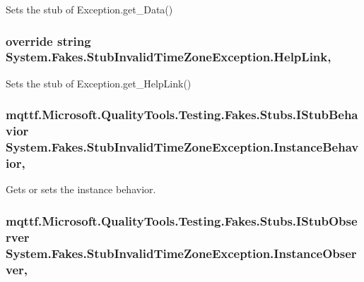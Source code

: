 Sets the stub of Exception.\-get\-\_\-\-Data()

\hypertarget{class_system_1_1_fakes_1_1_stub_invalid_time_zone_exception_a36448215bfd23451ae26c17ca0a390a2}{
\subsubsection[{Help\-Link}]{\setlength{\rightskip}{0pt plus 5cm}override string System.\-Fakes.\-Stub\-Invalid\-Time\-Zone\-Exception.\-Help\-Link\hspace{0.3cm}{\ttfamily [get]}, {\ttfamily [set]}}}\label{class_system_1_1_fakes_1_1_stub_invalid_time_zone_exception_a36448215bfd23451ae26c17ca0a390a2}


Sets the stub of Exception.\-get\-\_\-\-Help\-Link()

\hypertarget{class_system_1_1_fakes_1_1_stub_invalid_time_zone_exception_a7505d9efbe518862b0ae6f9dfc024340}{
\subsubsection[{Instance\-Behavior}]{\setlength{\rightskip}{0pt plus 5cm}mqttf.\-Microsoft.\-Quality\-Tools.\-Testing.\-Fakes.\-Stubs.\-I\-Stub\-Behavior System.\-Fakes.\-Stub\-Invalid\-Time\-Zone\-Exception.\-Instance\-Behavior\hspace{0.3cm}{\ttfamily [get]}, {\ttfamily [set]}}}\label{class_system_1_1_fakes_1_1_stub_invalid_time_zone_exception_a7505d9efbe518862b0ae6f9dfc024340}


Gets or sets the instance behavior.

\hypertarget{class_system_1_1_fakes_1_1_stub_invalid_time_zone_exception_a05ad7dd5744c3ec05676edabf5201a7c}{
\subsubsection[{Instance\-Observer}]{\setlength{\rightskip}{0pt plus 5cm}mqttf.\-Microsoft.\-Quality\-Tools.\-Testing.\-Fakes.\-Stubs.\-I\-Stub\-Observer System.\-Fakes.\-Stub\-Invalid\-Time\-Zone\-Exception.\-Instance\-Observer\hspace{0.3cm}{\ttfamily [get]}, {\ttfamily [set]}}}\label{class_system_1_1_fakes_1_1_stub_invalid_time_zone_exception_a05ad7dd5744c3ec05676edabf5201a7c}


